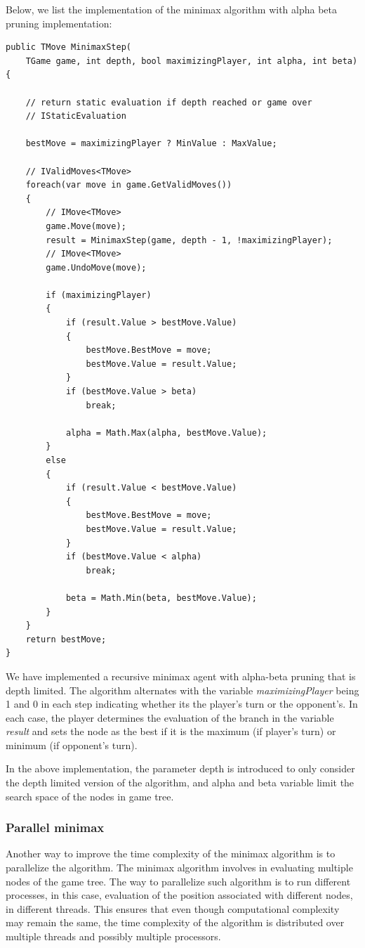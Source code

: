 Below, we list the implementation of the minimax algorithm with alpha beta pruning implementation:

\begin{lstlisting}
public TMove MinimaxStep(
    TGame game, int depth, bool maximizingPlayer, int alpha, int beta) {
    
    // return static evaluation if depth reached or game over
    // IStaticEvaluation

    bestMove = maximizingPlayer ? MinValue : MaxValue;
    
    // IValidMoves<TMove>
    foreach(var move in game.GetValidMoves())
    {
        // IMove<TMove>
        game.Move(move);
        result = MinimaxStep(game, depth - 1, !maximizingPlayer);
        // IMove<TMove>
        game.UndoMove(move);

        if (maximizingPlayer)
        {
            if (result.Value > bestMove.Value)
            {
                bestMove.BestMove = move;
                bestMove.Value = result.Value;
            }
            if (bestMove.Value > beta)
                break;

            alpha = Math.Max(alpha, bestMove.Value);
        }
        else
        {
            if (result.Value < bestMove.Value)
            {
                bestMove.BestMove = move;
                bestMove.Value = result.Value;
            }
            if (bestMove.Value < alpha)
                break;

            beta = Math.Min(beta, bestMove.Value);
        }
    }
    return bestMove;
}
\end{lstlisting}

We have implemented a recursive minimax agent with alpha-beta pruning that is depth limited. The algorithm alternates with the variable \textit{maximizingPlayer} being 1 and 0 in each step indicating whether its the player's turn or the opponent's. In each case, the player determines the evaluation of the branch in the variable \textit{result} and sets the node as the best if it is the maximum (if player's turn) or minimum (if opponent's turn).

In the above implementation, the parameter depth is introduced to only consider the depth limited version of the algorithm, and alpha and beta variable limit the search space of the nodes in game tree.

\subsubsection{Parallel minimax}
Another way to improve the time complexity of the minimax algorithm is to parallelize the algorithm. The minimax algorithm involves in evaluating multiple nodes of the game tree. The way to parallelize such algorithm is to run different processes, in this case, evaluation of the position associated with different nodes, in different threads. This ensures that even though computational complexity may remain the same, the time complexity of the algorithm is distributed over multiple threads and possibly multiple processors.

